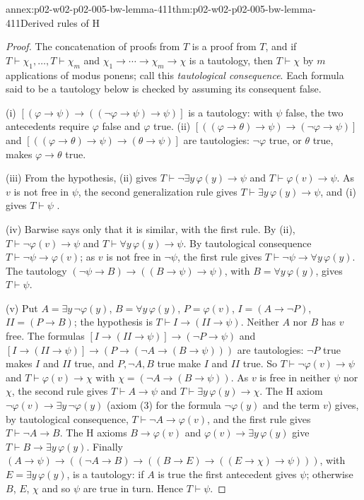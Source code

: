 \begin{annexitem}{annex:p02-w02-p02-005-bw-lemma-411}{thm:p02-w02-p02-005-bw-lemma-411}{Derived rules of H}
\begin{proof}
The concatenation of proofs from \(T\) is a proof from \(T\), and if
\(T\vdash\chi_1,\ldots,T\vdash\chi_m\) and
\(\chi_1\to\cdots\to\chi_m\to\chi\) is a tautology, then \(T\vdash\chi\) by
\(m\) applications of modus ponens; call this \emph{tautological
consequence}.  Each formula said to be a tautology below is checked by
assuming its consequent false.

(i) \([(\varphi\to\psi)\to((\neg\varphi\to\psi)\to\psi)]\) is a tautology:
with \(\psi\) false, the two antecedents require \(\varphi\) false and
\(\varphi\) true.  (ii) \([((\varphi\to\theta)\to\psi)\to(\neg\varphi\to\psi)]\)
and \([((\varphi\to\theta)\to\psi)\to(\theta\to\psi)]\) are tautologies:
\(\neg\varphi\) true, or \(\theta\) true, makes \(\varphi\to\theta\) true.

(iii) From the hypothesis, (ii) gives \(T\vdash\neg\exists y\,\varphi(y)\to\psi\)
and \(T\vdash\varphi(v)\to\psi\).  As \(v\) is not free in \(\psi\), the
second generalization rule gives \(T\vdash\exists y\,\varphi(y)\to\psi\),
and (i) gives \(T\vdash\psi\) \cite[ch.~A.1, \S4, p.~36]{Barwise1977FirstOrder}.

(iv) Barwise says only that it is similar, with the first rule.  By (ii),
\(T\vdash\neg\varphi(v)\to\psi\) and \(T\vdash\forall y\,\varphi(y)\to\psi\).
By tautological consequence \(T\vdash\neg\psi\to\varphi(v)\); as \(v\) is
not free in \(\neg\psi\), the first rule gives
\(T\vdash\neg\psi\to\forall y\,\varphi(y)\).  The tautology
\((\neg\psi\to B)\to((B\to\psi)\to\psi)\), with \(B=\forall y\,\varphi(y)\),
gives \(T\vdash\psi\).

(v) Put \(A=\exists y\,\neg\varphi(y)\), \(B=\forall y\,\varphi(y)\),
\(P=\varphi(v)\), \(I=(A\to\neg P)\), \(I\!I=(P\to B)\); the hypothesis is
\(T\vdash I\to(I\!I\to\psi)\).  Neither \(A\) nor \(B\) has \(v\) free.
The formulas \([I\to(I\!I\to\psi)]\to(\neg P\to\psi)\) and
\([I\to(I\!I\to\psi)]\to(P\to(\neg A\to(B\to\psi)))\) are tautologies:
\(\neg P\) true makes \(I\) and \(I\!I\) true, and \(P,\neg A,B\) true make
\(I\) and \(I\!I\) true.  So \(T\vdash\neg\varphi(v)\to\psi\) and
\(T\vdash\varphi(v)\to\chi\) with \(\chi=(\neg A\to(B\to\psi))\).  As \(v\)
is free in neither \(\psi\) nor \(\chi\), the second rule gives
\(T\vdash A\to\psi\) and \(T\vdash\exists y\,\varphi(y)\to\chi\).  The H
axiom \(\neg\varphi(v)\to\exists y\,\neg\varphi(y)\) (axiom (3) for the
formula \(\neg\varphi(y)\) and the term \(v\)) gives, by tautological
consequence, \(T\vdash\neg A\to\varphi(v)\), and the first rule gives
\(T\vdash\neg A\to B\).  The H axioms \(B\to\varphi(v)\) and
\(\varphi(v)\to\exists y\,\varphi(y)\) give
\(T\vdash B\to\exists y\,\varphi(y)\).  Finally
\((A\to\psi)\to((\neg A\to B)\to((B\to E)\to((E\to\chi)\to\psi)))\), with
\(E=\exists y\,\varphi(y)\), is a tautology: if \(A\) is true the first
antecedent gives \(\psi\); otherwise \(B\), \(E\), \(\chi\) and so \(\psi\)
are true in turn.  Hence \(T\vdash\psi\).
\end{proof}
\end{annexitem}

